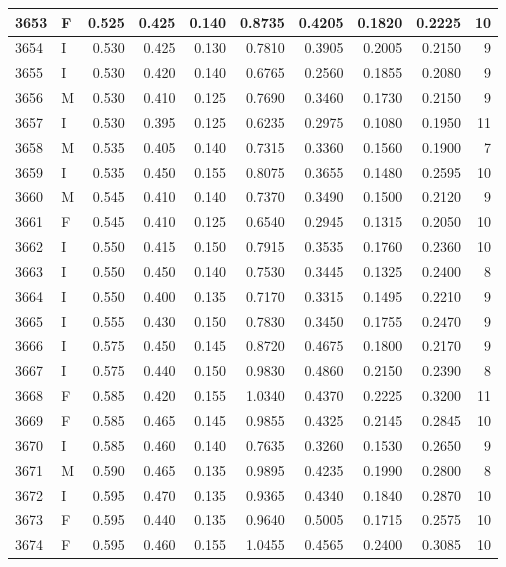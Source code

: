 \documentclass[9pt,twocolumn,twoside,]{pnas-new}
\begin{document}
\begin{tabular}{l|l|r|r|r|r|r|r|r|r}
\hline
3653 & F & 0.525 & 0.425 & 0.140 & 0.8735 & 0.4205 & 0.1820 & 0.2225 & 10\\
\hline
3654 & I & 0.530 & 0.425 & 0.130 & 0.7810 & 0.3905 & 0.2005 & 0.2150 & 9\\
\hline
3655 & I & 0.530 & 0.420 & 0.140 & 0.6765 & 0.2560 & 0.1855 & 0.2080 & 9\\
\hline
3656 & M & 0.530 & 0.410 & 0.125 & 0.7690 & 0.3460 & 0.1730 & 0.2150 & 9\\
\hline
3657 & I & 0.530 & 0.395 & 0.125 & 0.6235 & 0.2975 & 0.1080 & 0.1950 & 11\\
\hline
3658 & M & 0.535 & 0.405 & 0.140 & 0.7315 & 0.3360 & 0.1560 & 0.1900 & 7\\
\hline
3659 & I & 0.535 & 0.450 & 0.155 & 0.8075 & 0.3655 & 0.1480 & 0.2595 & 10\\
\hline
3660 & M & 0.545 & 0.410 & 0.140 & 0.7370 & 0.3490 & 0.1500 & 0.2120 & 9\\
\hline
3661 & F & 0.545 & 0.410 & 0.125 & 0.6540 & 0.2945 & 0.1315 & 0.2050 & 10\\
\hline
3662 & I & 0.550 & 0.415 & 0.150 & 0.7915 & 0.3535 & 0.1760 & 0.2360 & 10\\
\hline
3663 & I & 0.550 & 0.450 & 0.140 & 0.7530 & 0.3445 & 0.1325 & 0.2400 & 8\\
\hline
3664 & I & 0.550 & 0.400 & 0.135 & 0.7170 & 0.3315 & 0.1495 & 0.2210 & 9\\
\hline
3665 & I & 0.555 & 0.430 & 0.150 & 0.7830 & 0.3450 & 0.1755 & 0.2470 & 9\\
\hline
3666 & I & 0.575 & 0.450 & 0.145 & 0.8720 & 0.4675 & 0.1800 & 0.2170 & 9\\
\hline
3667 & I & 0.575 & 0.440 & 0.150 & 0.9830 & 0.4860 & 0.2150 & 0.2390 & 8\\
\hline
3668 & F & 0.585 & 0.420 & 0.155 & 1.0340 & 0.4370 & 0.2225 & 0.3200 & 11\\
\hline
3669 & F & 0.585 & 0.465 & 0.145 & 0.9855 & 0.4325 & 0.2145 & 0.2845 & 10\\
\hline
3670 & I & 0.585 & 0.460 & 0.140 & 0.7635 & 0.3260 & 0.1530 & 0.2650 & 9\\
\hline
3671 & M & 0.590 & 0.465 & 0.135 & 0.9895 & 0.4235 & 0.1990 & 0.2800 & 8\\
\hline
3672 & I & 0.595 & 0.470 & 0.135 & 0.9365 & 0.4340 & 0.1840 & 0.2870 & 10\\
\hline
3673 & F & 0.595 & 0.440 & 0.135 & 0.9640 & 0.5005 & 0.1715 & 0.2575 & 10\\
\hline
3674 & F & 0.595 & 0.460 & 0.155 & 1.0455 & 0.4565 & 0.2400 & 0.3085 & 10\\

\end{tabular}
\end{document}
